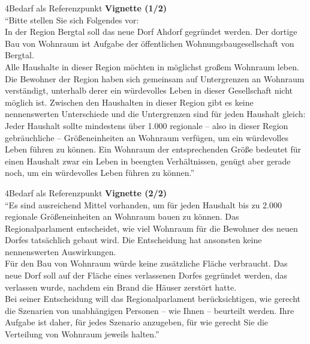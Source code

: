 \documentclass[xcolor=table,9pt,aspectratio=169]{beamer}
\begin{document}
\begin{frame}{\vspace*{10mm}4\hspace*{1em}Bedarf als Referenzpunkt}
\textbf{Vignette (1/2)}\\
\medskip
\enquote{Bitte stellen Sie sich Folgendes vor:\\
\medskip
In der Region Bergtal soll das neue Dorf Ahdorf gegründet werden. Der dortige Bau von Wohnraum ist Aufgabe der öffentlichen Wohnungsbaugesellschaft von Bergtal.\\
\medskip
Alle Haushalte in dieser Region möchten in möglichst großem Wohnraum leben. Die Bewohner der Region haben sich gemeinsam auf Untergrenzen an Wohnraum verständigt, unterhalb derer ein würdevolles Leben in dieser Gesellschaft nicht möglich ist. Zwischen den Haushalten in dieser Region gibt es keine nennenswerten Unterschiede und die Untergrenzen sind für jeden Haushalt gleich: Jeder Haushalt sollte mindestens über 1.000 regionale -- also in dieser Region gebräuchliche -- Größeneinheiten an Wohnraum verfügen, um ein würdevolles Leben führen zu können. Ein Wohnraum der entsprechenden Größe bedeutet für einen Haushalt zwar ein Leben in beengten Verhältnissen, genügt aber gerade noch, um ein würdevolles Leben führen zu können.}
\end{frame}


\begin{frame}{\vspace*{10mm}4\hspace*{1em}Bedarf als Referenzpunkt}
\textbf{Vignette (2/2)}\\
\medskip
\enquote{Es sind ausreichend Mittel vorhanden, um für jeden Haushalt bis zu 2.000 regionale Größeneinheiten an Wohnraum bauen zu können. Das Regionalparlament entscheidet, wie viel Wohnraum für die Bewohner des neuen Dorfes tatsächlich gebaut wird. Die Entscheidung hat ansonsten keine nennenswerten Auswirkungen.\\
\medskip
Für den Bau von Wohnraum würde keine zusätzliche Fläche verbraucht. Das neue Dorf soll auf der Fläche eines verlassenen Dorfes gegründet werden, das verlassen wurde, nachdem ein Brand die Häuser zerstört hatte.\\
\medskip
Bei seiner Entscheidung will das Regionalparlament berücksichtigen, wie gerecht die Szenarien von unabhängigen Personen -- wie Ihnen -- beurteilt werden. Ihre Aufgabe ist daher, für jedes Szenario anzugeben, für wie gerecht Sie die Verteilung von Wohnraum jeweils halten.}
\end{frame}
\end{document}
